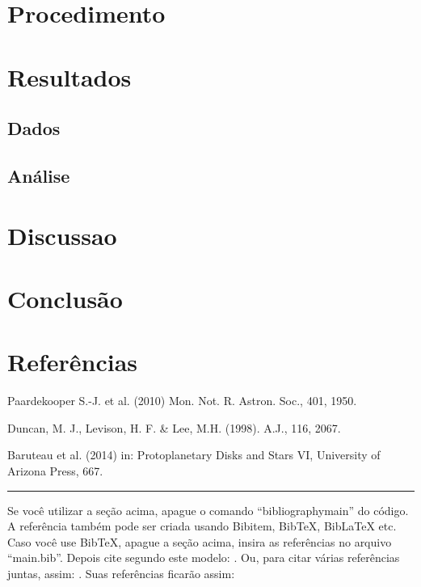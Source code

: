 \documentclass[12pt,a4paper,twoside]{article}
\begin{document}
\section{Procedimento} %


\section{Resultados} %

\subsection{Dados}


\subsection{Análise} %


\section{Discussao} %


\section{Conclusão} %



\section*{Referências} %

    \noindent Paardekooper S.-J. et al. (2010) Mon. Not. R. Astron. Soc., 401,
1950. %

    \noindent Duncan, M. J., Levison, H. F. \& Lee, M.H. (1998). A.J., 116, 2067. %

    \noindent Baruteau et al. (2014) in: Protoplanetary Disks and Stars VI, University of Arizona Press, 667. %

\vspace{\baselineskip} \hrule

\vspace{2\baselineskip}

Se você utilizar a seção acima, apague o comando ``bibliography{main}'' do código. A referência também pode ser criada usando Bibitem, BibTeX, BibLaTeX etc. Caso você use BibTeX, apague a seção acima, insira as referências no arquivo ``main.bib''. Depois cite segundo este modelo: \cite{greenwade93}. Ou, para citar várias referências juntas, assim: \cite{greenwade93,wikimedia-latex}. Suas referências ficarão assim:


\end{document}
